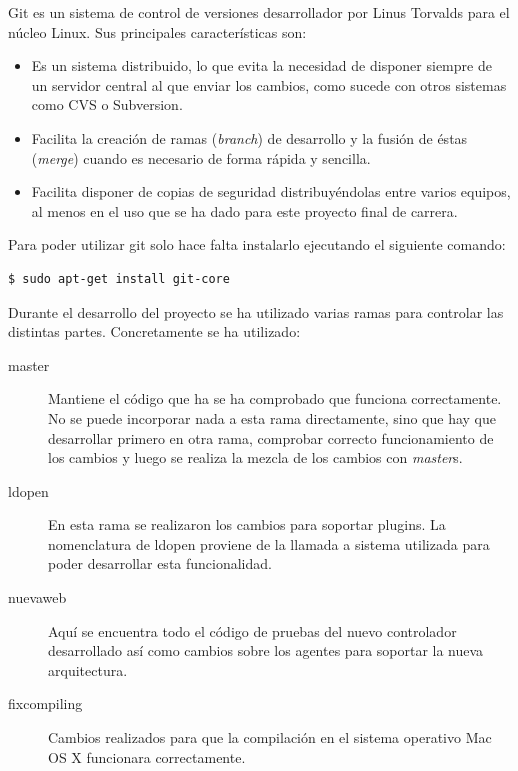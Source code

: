 Git es un sistema de control de versiones desarrollador por Linus Torvalds para el núcleo Linux. Sus principales características son:

\begin{itemize}
	\item Es un sistema distribuido, lo que evita la necesidad de disponer siempre de un servidor central al que enviar los cambios, como sucede con otros sistemas como CVS o Subversion.
	
	\item Facilita la creación de ramas (\emph{branch}) de desarrollo y la fusión de éstas (\emph{merge}) cuando es necesario de forma rápida y sencilla.
	
	\item Facilita disponer de copias de seguridad distribuyéndolas entre varios equipos, al menos en el uso que se ha dado para este proyecto final de carrera.
\end{itemize}

Para poder utilizar git solo hace falta instalarlo ejecutando el siguiente comando:

\begin{verbatim}
$ sudo apt-get install git-core
\end{verbatim}

Durante el desarrollo del proyecto se ha utilizado varias ramas para controlar las distintas partes. Concretamente se ha utilizado:

\begin{description}
	\item[master] Mantiene el código que ha se ha comprobado que funciona correctamente. No se puede incorporar nada a esta rama directamente, sino que hay que desarrollar primero en otra rama, comprobar correcto funcionamiento de los cambios y luego se realiza la mezcla de los cambios con \emph{master}s.
	
	\item[ldopen] En esta rama se realizaron los cambios para soportar plugins. La nomenclatura de ldopen proviene de la llamada a sistema utilizada para poder desarrollar esta funcionalidad.
	
	\item[nuevaweb] Aquí se encuentra todo el código de pruebas del nuevo controlador desarrollado así como cambios sobre los agentes para soportar la nueva arquitectura.
	
	\item[fixcompiling] Cambios realizados para que la compilación en el sistema operativo Mac OS X funcionara correctamente.
\end{description}

